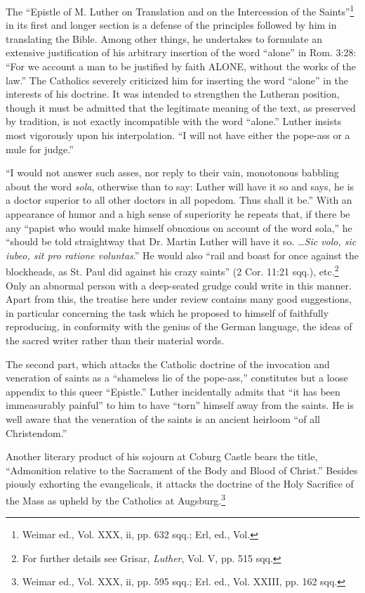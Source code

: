 The “Epistle of M. Luther on Translation and on the Intercession
of the Saints”\footnote{Weimar ed., Vol. XXX, ii, pp. 632 sqq.; Erl, ed., Vol.}
in its first and longer section is a defense of the principles
followed by him in translating the Bible. Among other things,
he undertakes to formulate an extensive justification of his arbitrary
insertion of the word “alone” in Rom. 3:28: “For we account a
man to be justified by faith ALONE, without the works of the law.”
The Catholics severely criticized him for inserting the word “alone”
in the interests of his doctrine. It was intended to strengthen the Lutheran
position, though it must be admitted that the legitimate meaning
of the text, as preserved by tradition, is not exactly incompatible
with the word “alone.” Luther insists most vigorously upon his interpolation.
“I will not have either the pope-ass or a mule for judge.”

“I would not answer such asses, nor reply to their vain, monotonous
babbling about the word \textit{sola}, otherwise than to say: Luther will
have it so and says, he is a doctor superior to all other doctors in all
popedom. Thus shall it be.” With an appearance of humor and a
high sense of superiority he repeats that, if there be any “papist who
would make himself obnoxious on account of the word sola,” he
“should be told straightway that Dr. Martin Luther will have it so.
\dots \textit{Sic volo, sic iubeo, sit pro ratione voluntas}.” He would also “rail
and boast for once against the blockheads, as St. Paul did against his
crazy saints” (2 Cor. 11:21 sqq.), etc.\footnote
{For further details see Grisar, \textit{Luther}, Vol. V, pp. 515 sqq.}
Only an abnormal person
with a deep-seated grudge could write in this manner. Apart from
this, the treatise here under review contains many good suggestions, in
particular concerning the task which he proposed to himself of faithfully
reproducing, in conformity with the genius of the German
language, the ideas of the sacred writer rather than their material
words.

The second part, which attacks the Catholic doctrine of the invocation
and veneration of saints as a “shameless lie of the pope-ass,”
constitutes but a loose appendix to this queer “Epistle.” Luther incidentally
admits that “it has been immeasurably painful” to him to
have “torn” himself away from the saints. He is well aware that the
veneration of the saints is an ancient heirloom “of all Christendom.”

Another literary product of his sojourn at Coburg Castle bears the
title, “Admonition relative to the Sacrament of the Body and Blood
of Christ.” Besides piously exhorting the evangelicals, it attacks the
doctrine of the Holy Sacrifice of the Mass as upheld by the Catholics
at Augsburg.\footnote{Weimar ed., Vol. XXX, ii, pp. 595 sqq.; Erl. ed., Vol. XXIII, pp. 162 sqq.}

